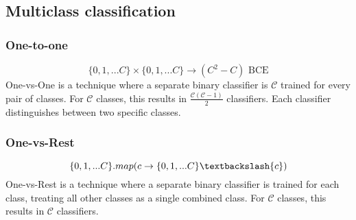 \documentclass{article}
\begin{document}
\subsection*{Multiclass classification}
\subsubsection*{One-to-one}
\[\{0, 1, ... C\} \times \{0, 1, ... C\} \rightarrow (C^2 - C) \text{ BCE}\]
One-vs-One is a technique where a separate binary classifier is $\mathcal{C}$ trained for every pair of classes. For $\mathcal{C}$ classes, this results in $\frac{\mathcal{C}(\mathcal{C} - 1)}{2}$ classifiers. Each classifier distinguishes between two specific classes.
\subsubsection*{One-vs-Rest}
\[\{0, 1, ... C\}.map(c \rightarrow \{0, 1, ... C\} \textbackslash \{c\})\]
One-vs-Rest is a technique where a separate binary classifier is trained for each class, treating all other classes as a single combined class. For $\mathcal{C}$ classes, this results in $\mathcal{C}$ classifiers.
\end{document}
